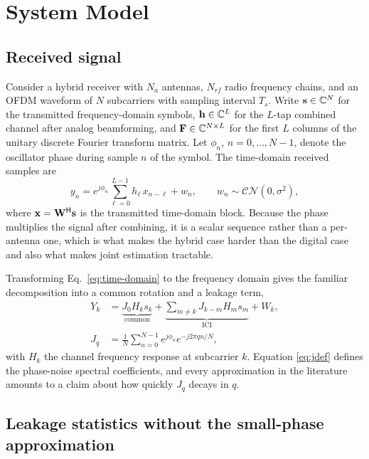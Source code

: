 \section{System Model}
\label{sec:system-model}

\subsection{Received signal}

Consider a hybrid receiver with $N_a$ antennas, $N_{rf}$ radio frequency
chains, and an OFDM waveform of $N$ subcarriers with sampling interval $T_s$.
Write $\mathbf{s} \in \mathbb{C}^{N}$ for the transmitted frequency-domain
symbols, $\mathbf{h} \in \mathbb{C}^{L}$ for the $L$-tap combined channel after
analog beamforming, and $\mathbf{F} \in \mathbb{C}^{N \times L}$ for the first $L$
columns of the unitary discrete Fourier transform matrix. Let
$\phi_n$, $n = 0, \dots, N-1$, denote the oscillator phase during sample $n$ of
the symbol. The time-domain received samples are
\begin{equation}
  \label{eq:time-domain}
  y_n = e^{j \phi_n} \sum_{\ell=0}^{L-1} h_\ell \, x_{n-\ell} + w_n ,
  \qquad w_n \sim \mathcal{CN}(0, \sigma^2) ,
\end{equation}
where $\mathbf{x} = \mathbf{W}^{\mathsf{H}} \mathbf{s}$ is the transmitted time-domain
block. Because the phase multiplies the signal after combining, it is a scalar
sequence rather than a per-antenna one, which is what makes the hybrid case
harder than the digital case and also what makes joint estimation tractable.

Transforming Eq.~\eqref{eq:time-domain} to the frequency domain gives the
familiar decomposition into a common rotation and a leakage term,
\begin{align}
  \label{eq:freq-domain}
  Y_k
  &= \underbrace{J_0 H_k s_k}_{\text{common}}
     + \underbrace{\sum_{m \ne k} J_{k-m} H_m s_m}_{\text{ICI}}
     + W_k , \\
  \label{eq:jdef}
  J_q &= \frac{1}{N} \sum_{n=0}^{N-1} e^{j \phi_n} e^{-j 2\pi q n / N} ,
\end{align}
with $H_k$ the channel frequency response at subcarrier $k$. Equation
\eqref{eq:jdef} defines the phase-noise spectral coefficients, and every
approximation in the literature amounts to a claim about how quickly $J_q$
decays in $q$.

\subsection{Leakage statistics without the small-phase approximation}

